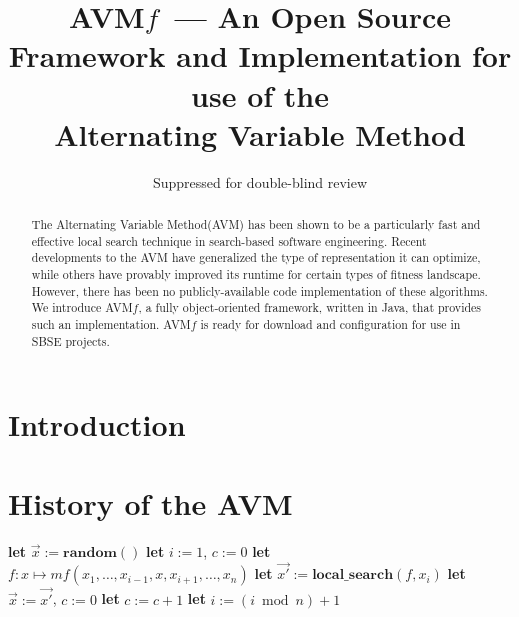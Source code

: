\documentclass{llncs}
\newcommand{\AVM}{Alternating Variable Method\xspace}
\newcommand{\name}{AVM\hspace{-1pt}$f$\xspace}
\newcommand{\mf}{\mathit{mf}}
\begin{document}
\title{\name ~--- An Open Source Framework and Implementation for use of the \\ \AVM}
\author{Suppressed for double-blind review}

\maketitle

\begin{abstract}
The \AVM (AVM) has been shown to be a particularly fast and effective local search technique in search-based software engineering. %
%
Recent developments to the AVM have generalized the type of representation it can optimize, while others have provably improved its runtime for certain types of fitness landscape. However, there has been no publicly-available code implementation of these algorithms. We introduce \name, a  fully object-oriented framework, written in Java, that provides such an implementation. \name is ready for download and configuration for use in SBSE projects.

\end{abstract}

\section{Introduction}

\section{History of the AVM}



\begin{algorithm}
	\small
		\caption{The outer loop of the AVM for optimizing $\vec{x} = (x_1, \dots, x_n)$ \mbox{(taken from Kempka et al. \cite{Kempka2015})}}
	\begin{algorithmic}[1]
			\STATE \textbf{let} $\vec{x}:=\mathbf{random}()$
			\STATE \textbf{let} $i:=1$, $c:=0$
				\STATE \textbf{let} $f \colon x \mapsto \mf(x_1, \dots, x_{i-1}, x, x_{i+1}, \dots, x_n)$
				\STATE \textbf{let} $\vec{x'}:=\mathbf{local\_search}(f,x_i)$
				 \IF{$\mf(\vec{x'})<\mf(\vec{x})$}
					\STATE \textbf{let} $\vec{x}:=\vec{x'}$, $c:=0$
				\ELSE
					\STATE \textbf{let} $c:=c+1$
				\ENDIF
				\STATE \textbf{let} $i:= (i \bmod n) +1$
			\ENDWHILE
		\ENDWHILE
	\end{algorithmic}
	\label{alg:framework}
\end{algorithm}
\end{document}
